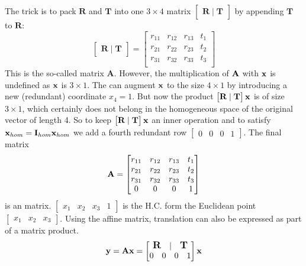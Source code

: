 \documentclass[a4paper]{article}
\begin{document}
\begin{enumerate}
    The trick is to pack \textbf{}$\textbf{R}$ and $\textbf{T}$ into one $3\times 4$ matrix $\begin{bmatrix}
    \textbf{R} \; | \; \textbf{T}
    \end{bmatrix}$ by appending $\textbf{T}$ to $\textbf{R}$:
    \[
    \begin{bmatrix}
    \textbf{R}\; | \; \textbf{T}
    \end{bmatrix} = 
    \begin{bmatrix}
        r_{11} & r_{12} & r_{13} & t_1 \\
        r_{21} & r_{22} & r_{23} & t_2 \\
        r_{31} & r_{32} & r_{33} & t_3 \\
    \end{bmatrix}
    \]
    This is the so-called  matrix $\textbf{A}$. However, the multiplication of $\textbf{A}$ with $\textbf{x}$ is undefined as $\textbf{x}$ is $3 \times 1$. The can augment $\textbf{x}$ to the size $4 \times 1$ by introducing a new (redundant) coordinate $x_4=1$. But now the product $\begin{bmatrix}\textbf{R}\; | \; \textbf{T}\end{bmatrix} \textbf{x}$ is of size $3 \times 1$, which certainly does not belong in the homogeneous space of the original vector of length 4. So to keep $\begin{bmatrix}\textbf{R}\; | \; \textbf{T}\end{bmatrix} \textbf{x}$  an inner operation and to satisfy $\textbf{x}_{hom} = \textbf{I}_{hom}\textbf{x}_{hom}$  we add a fourth redundant row $\begin{bmatrix} 0 & 0 & 0 & 1\end{bmatrix}$. The final matrix
    \[
    \textbf{A} =     \begin{bmatrix}
        r_{11} & r_{12} & r_{13} & t_1 \\
        r_{21} & r_{22} & r_{23} & t_2 \\
        r_{31} & r_{32} & r_{33} & t_3 \\
        0 & 0 & 0 & 1
    \end{bmatrix}
    \]
    is an  matrix. $\begin{bmatrix} x_1 & x_2 & x_3 & 1 \end{bmatrix}$ is the H.C. form the Euclidean point $\begin{bmatrix} x_1 & x_2 & x_3\end{bmatrix}$. Using the affine matrix, translation can also be expressed as part of a matrix product.
    \[
    \textbf{y} = \textbf{A}\textbf{x} = 
    \begin{bmatrix}
        \begin{matrix}
            \textbf{\large{R}} \quad |  \quad \textbf{\large{T}}
        \end{matrix} \\
        \begin{matrix}
            0 & 0 & 0 & 1
        \end{matrix}
    \end{bmatrix} \textbf{x}
    \]
    

\end{enumerate}
\end{document}
